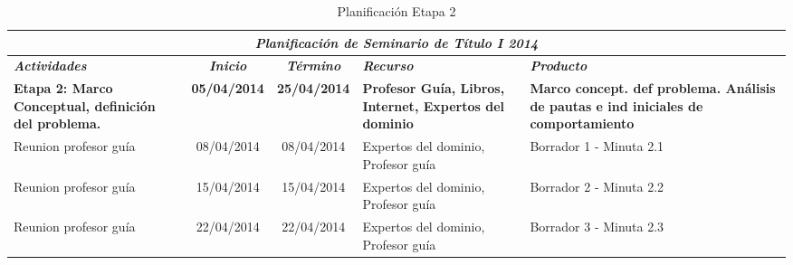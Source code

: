 \documentclass[12pt,letterpaper]{article}
\begin{document}
\begin{table}[htf]
\begin{tabular}{| p{4cm} | c | c | p{3cm}  | p{2.5cm} |}
\hline

\multicolumn{5}{|c|}{\textbf{\textit{Planificaci\'on de Seminario de T\'itulo I 2014}}} \\ \hline \hline
\textit{\textbf{Actividades}} & 
\textit{\textbf{Inicio}} & 
\textit{\textbf{T\'ermino}} & 
\centering \textit{\textbf{Recurso}} & 
\textit{\textbf{Producto}} \\ \hline \hline
\textbf{Etapa 2: Marco Conceptual, definici\'on del problema.} & 
\textbf{05/04/2014} & 
\textbf{25/04/2014} & 
\textbf{Profesor Gu\'ia, Libros, Internet, Expertos del dominio} & 
\textbf{Marco concept. def problema. An\'alisis de pautas e ind iniciales de comportamiento} \\ \hline


Reunion profesor gu\'ia & 
08/04/2014 & 
08/04/2014 &  
Expertos del dominio, Profesor gu\'ia & 
Borrador 1 - Minuta 2.1\\ \hline

Reunion profesor gu\'ia & 
15/04/2014 & 
15/04/2014 &  
Expertos del dominio, Profesor gu\'ia & 
Borrador 2 - Minuta 2.2 \\ \hline

Reunion profesor gu\'ia & 
22/04/2014 & 
22/04/2014 &  
Expertos del dominio, Profesor gu\'ia & 
Borrador 3 - Minuta 2.3\\ \hline


\hline
\end{tabular}
\caption{Planificaci\'on Etapa 2}
\end{table}



\newpage
\clearpage


\end{document}

